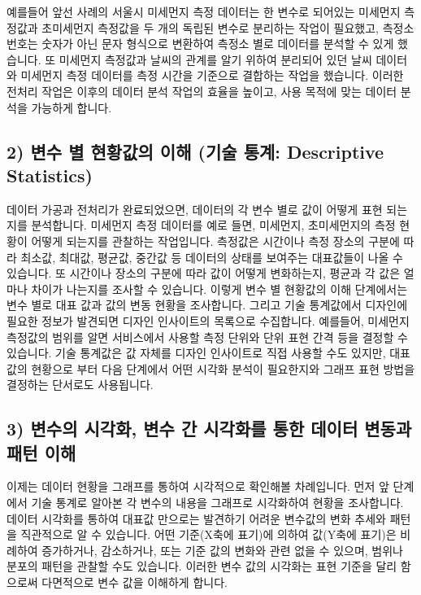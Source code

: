 \documentclass[
  letterpaper,
]{book}
\begin{document}
예를들어 앞선 사례의 서울시 미세먼지 측정 데이터는 한 변수로 되어있는
미세먼지 측정값과 초미세먼지 측정값을 두 개의 독립된 변수로 분리하는
작업이 필요했고, 측정소 번호는 숫자가 아닌 문자 형식으로 변환하여 측정소
별로 데이터를 분석할 수 있게 했습니다. 또 미세먼지 측정값과 날씨의
관계를 알기 위하여 분리되어 있던 날씨 데이터와 미세먼지 측정 데이터를
측정 시간을 기준으로 결합하는 작업을 했습니다. 이러한 전처리 작업은
이후의 데이터 분석 작업의 효율을 높이고, 사용 목적에 맞는 데이터 분석을
가능하게 합니다.

\subsection{2) 변수 별 현황값의 이해 (기술 통계: Descriptive
Statistics)}\label{uxbcc0uxc218-uxbcc4-uxd604uxd669uxac12uxc758-uxc774uxd574-uxae30uxc220-uxd1b5uxacc4-descriptive-statistics}

데이터 가공과 전처리가 완료되었으면, 데이터의 각 변수 별로 값이 어떻게
표현 되는지를 분석합니다. 미세먼지 측정 데이터를 예로 들면, 미세먼지,
초미세먼지의 측정 현황이 어떻게 되는지를 관찰하는 작업입니다. 측정값은
시간이나 측정 장소의 구분에 따라 최소값, 최대값, 평균값, 중간값 등
데이터의 상태를 보여주는 대표값들이 나올 수 있습니다. 또 시간이나 장소의
구분에 따라 값이 어떻게 변화하는지, 평균과 각 값은 얼마나 차이가
나는지를 조사할 수 있습니다. 이렇게 변수 별 현황값의 이해 단계에서는
변수 별로 대표 값과 값의 변동 현황을 조사합니다. 그리고 기술 통계값에서
디자인에 필요한 정보가 발견되면 디자인 인사이트의 목록으로 수집합니다.
예를들어, 미세먼지 측정값의 범위를 알면 서비스에서 사용할 측정 단위와
단위 표현 간격 등을 결정할 수 있습니다. 기술 통계값은 값 자체를 디자인
인사이트로 직접 사용할 수도 있지만, 대표값의 현황으로 부터 다음 단계에서
어떤 시각화 분석이 필요한지와 그래프 표현 방법을 결정하는 단서로도
사용됩니다.

\subsection{3) 변수의 시각화, 변수 간 시각화를 통한 데이터 변동과 패턴
이해}\label{uxbcc0uxc218uxc758-uxc2dcuxac01uxd654-uxbcc0uxc218-uxac04-uxc2dcuxac01uxd654uxb97c-uxd1b5uxd55c-uxb370uxc774uxd130-uxbcc0uxb3d9uxacfc-uxd328uxd134-uxc774uxd574}

이제는 데이터 현황을 그래프를 통하여 시각적으로 확인해볼 차례입니다.
먼저 앞 단계에서 기술 통계로 알아본 각 변수의 내용을 그래프로 시각화하여
현황을 조사합니다. 데이터 시각화를 통하여 대표값 만으로는 발견하기
어려운 변수값의 변화 추세와 패턴을 직관적으로 알 수 있습니다. 어떤
기준(X축에 표기)에 의하여 값(Y축에 표기)은 비례하여 증가하거나,
감소하거나, 또는 기준 값의 변화와 관련 없을 수 있으며, 범위나 분포의
패턴을 관찰할 수도 있습니다. 이러한 변수 값의 시각화는 표현 기준을 달리
함으로써 다면적으로 변수 값을 이해하게 합니다.
\end{document}
